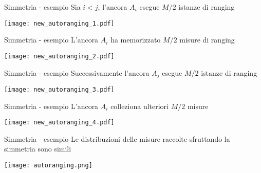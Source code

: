 \begin{frame}{Simmetria - esempio}
  Sia $i<j$, l'ancora $A_i$ esegue $M/2$ istanze di ranging
  \begin{center}
    \texttt{[image: new\_autoranging\_1.pdf]}
  \end{center}
\end{frame}

\begin{frame}{Simmetria - esempio}
  L'ancora $A_i$ ha memorizzato $M/2$ misure di ranging
  \begin{center}
    \texttt{[image: new\_autoranging\_2.pdf]}
  \end{center}
\end{frame}

\begin{frame}{Simmetria - esempio}
  Successivamente l'ancora $A_j$ esegue $M/2$ istanze di ranging
  \begin{center}
    \texttt{[image: new\_autoranging\_3.pdf]}
  \end{center}
\end{frame}

\begin{frame}{Simmetria - esempio}
  L'ancora $A_i$ colleziona ulteriori $M/2$ misure
  \begin{center}
    \texttt{[image: new\_autoranging\_4.pdf]}
  \end{center}
\end{frame}

\begin{frame}{Simmetria - esempio}
  Le distribuzioni delle misure raccolte sfruttando la simmetria sono simili 
  \begin{center}
    \texttt{[image: autoranging.png]}
  \end{center}
\end{frame}

